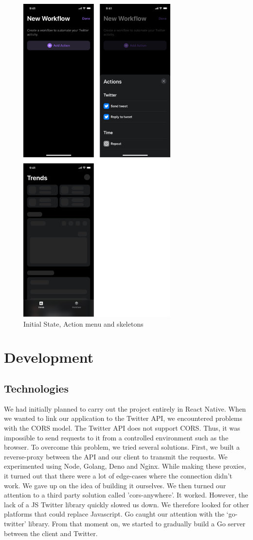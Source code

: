 \documentclass{report}
\begin{document}
\begin{figure}[htp]
    \centering
    \includegraphics[width=8cm]{gui2}
    \caption{Initial State, Action menu and skeletons}
    \label{fig:gui2}
\end{figure}

\chapter{Development}

\section{Technologies}
We had initially planned to carry out the project entirely in React Native. When we wanted to link our application to the Twitter API, we encountered problems with the CORS model. The Twitter API does not support CORS. Thus, it was impossible to send requests to it from a controlled environment such as the browser. To overcome this problem, we tried several solutions. First, we built a reverse-proxy between the API and our client to transmit the requests. We experimented using Node, Golang, Deno and Nginx. While making these proxies, it turned out that there were a lot of edge-cases where the connection didn't work. We gave up on the idea of building it ourselves. We then turned our attention to a third party solution called 'cors-anywhere'. It worked.
However, the lack of a JS Twitter library quickly slowed us down. We therefore looked for other platforms that could replace Javascript. Go caught our attention with the `go-twitter' library. From that moment on, we started to gradually build a Go server between the client and Twitter.
\end{document}
